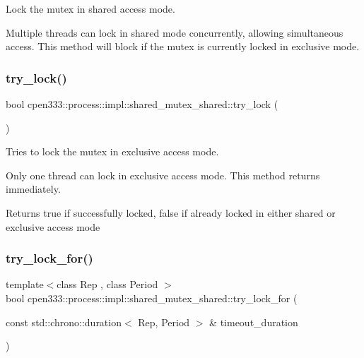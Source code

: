 Lock the mutex in shared access mode. 

Multiple threads can lock in shared mode concurrently, allowing simultaneous access. This method will block if the mutex is currently locked in exclusive mode. \mbox{\label{classcpen333_1_1process_1_1impl_1_1shared__mutex__shared_a14e358b1ecbdebd69fb89fdc3b2a4f61}} 
\subsubsection{\texorpdfstring{try\+\_\+lock()}{try\_lock()}}
{\footnotesize\ttfamily bool cpen333\+::process\+::impl\+::shared\+\_\+mutex\+\_\+shared\+::try\+\_\+lock (\begin{DoxyParamCaption}{ }\end{DoxyParamCaption})\hspace{0.3cm}{\ttfamily [inline]}}



Tries to lock the mutex in exclusive access mode. 

Only one thread can lock in exclusive access mode. This method returns immediately.

\begin{DoxyReturn}{Returns}
true if successfully locked, false if already locked in either shared or exclusive access mode 
\end{DoxyReturn}
\mbox{\label{classcpen333_1_1process_1_1impl_1_1shared__mutex__shared_a4437c703911edfa03d9cc759fbc6f9c3}} 
\subsubsection{\texorpdfstring{try\+\_\+lock\+\_\+for()}{try\_lock\_for()}}
{\footnotesize\ttfamily template$<$class Rep , class Period $>$ \\
bool cpen333\+::process\+::impl\+::shared\+\_\+mutex\+\_\+shared\+::try\+\_\+lock\+\_\+for (\begin{DoxyParamCaption}\item[{const std\+::chrono\+::duration$<$ Rep, Period $>$ \&}]{timeout\+\_\+duration }\end{DoxyParamCaption})\hspace{0.3cm}{\ttfamily [inline]}}



